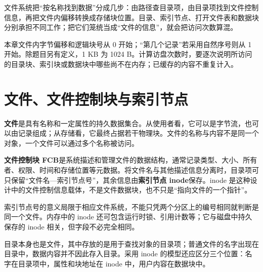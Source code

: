 文件系统把``按名称找到数据''分成几步：由路径查目录项，由目录项找到文件控制信息，再把文件内偏移转换成存储块位置。目录、索引节点、打开文件表和数据块分别承担不同工作；把它们笼统当成``文件的信息''，就会把访问次数算混。

本章文件内字节偏移和逻辑块号从 0 开始；``第几个记录''若采用自然序号则从 1 开始。除题目另有定义，1 KB 为 1024 B。计算访盘次数时，要逐次说明所访问的目录块、索引块或数据块中哪些尚不在内存；已缓存的内容不重复计入。

\section{文件、文件控制块与索引节点}\label{OS04-6-1}

\textbf{文件}是具有名称和一定属性的持久数据集合。从使用者看，它可以是字节流，也可以由记录组成；从存储看，它最终占据若干物理块。文件的名称与内容不是同一个对象，一个文件可以通过多个名称被访问。

\textbf{文件控制块 FCB}是系统描述和管理文件的数据结构，通常记录类型、大小、所有者、权限、时间和存储位置等元数据。将文件名与其他描述信息分离时，目录项可只保留``文件名---索引节点号''，其余信息由\textbf{索引节点 inode}保存。inode 是这种设计中的文件控制信息载体，不是文件数据块，也不只是``指向文件的一个指针''。

索引节点号的意义局限于相应文件系统，不能只凭两个分区上的编号相同就判断是同一个文件。内存中的 inode 还可包含运行时锁、引用计数等；它与磁盘中持久保存的 inode 相关，但字段不必完全相同。

目录本身也是文件，其中存放的是用于查找对象的目录项；普通文件的名字出现在目录中，数据内容并不因此存入目录。采用 inode 的模型还应区分三个位置：名字在目录项中，属性和块地址在 inode 中，用户内容在数据块中。

